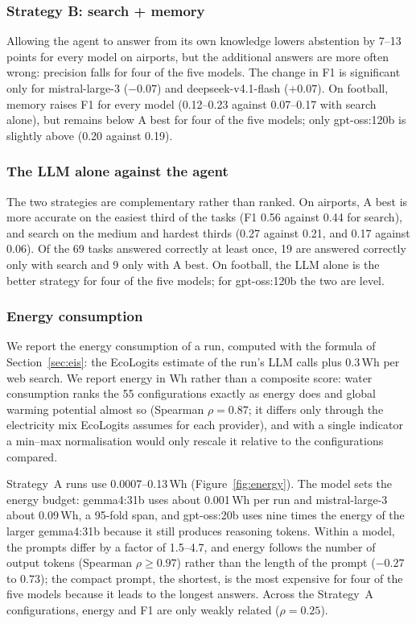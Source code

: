 \subsubsection{Strategy B: search + memory}

Allowing the agent to answer from its own knowledge lowers abstention by 7--13 points for every model on airports, but the
additional answers are more often wrong: precision falls for four of the five models. The change in F1 is significant only
for mistral-large-3 ($-0.07$) and deepseek-v4.1-flash ($+0.07$). On football, memory raises F1 for every model (0.12--0.23
against 0.07--0.17 with search alone), but remains below A best for four of the five models; only gpt-oss:120b is slightly
above (0.20 against 0.19).

\subsubsection{The LLM alone against the agent}

The two strategies are complementary rather than ranked. On airports, A best is more accurate on the easiest third of the
tasks (F1 0.56 against 0.44 for search), and search on the medium and hardest thirds (0.27 against 0.21, and 0.17 against
0.06). Of the 69 tasks answered correctly at least once, 19 are answered correctly only with search and 9 only with A best.
On football, the LLM alone is the better strategy for four of the five models; for gpt-oss:120b the two are level.

\subsubsection{Energy consumption}
\label{sec:lessons-energy}

We report the energy consumption of a run, computed with the formula of Section~\ref{sec:eis}: the EcoLogits estimate of
the run's LLM calls plus 0.3\,Wh per web search. We report energy in Wh rather than a composite score: water consumption
ranks the 55 configurations exactly as energy does and global warming potential almost so (Spearman $\rho = 0.87$; it
differs only through the electricity mix EcoLogits assumes for each provider), and with a single indicator a min--max
normalisation would only rescale it relative to the configurations compared.

Strategy~A runs use 0.0007--0.13\,Wh (Figure~\ref{fig:energy}). The model sets the energy budget: gemma4:31b uses about
0.001\,Wh per run and mistral-large-3 about 0.09\,Wh, a 95-fold span, and gpt-oss:20b uses nine times the energy of the
larger gemma4:31b because it still produces reasoning tokens. Within a model, the prompts differ by a factor of 1.5--4.7,
and energy follows the number of output tokens (Spearman $\rho \geq 0.97$) rather than the length of the prompt ($-0.27$
to $0.73$); the compact prompt, the shortest, is the most expensive for four of the five models because it leads to the
longest answers. Across the Strategy~A configurations, energy and F1 are only weakly related ($\rho = 0.25$).


